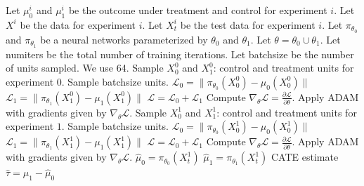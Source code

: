\begin{algorithm}[H]
	\caption{Warm Start T-learner}
	\label{alg:warm-t}
	\begin{algorithmic}[1]
		\State Let $\mu^{i}_0$ and $\mu^{i}_1$ be the outcome under treatment and control for experiment $i$. 
		\State Let $X^i$ be the data for experiment $i$. Let $X^i_t$ be the test data for experiment $i$. 
		\State Let $\pi_{\theta_0}$ and $\pi_{\theta_1}$ be a neural networks parameterized by $\theta_0$ and $\theta_1$. 
		\State Let $\theta = \theta_0 \cup \theta_1$. 
		\State Let numiters be the total number of training iterations.
		\State Let batchsize be the number of units sampled. We use 64. 
		\State Sample $X^0_0$ and $X^0_1$: control and treatment units for experiment $0$. Sample batchsize units.  
		\State $\mathcal{L}_0= \| \pi_{\theta_0} (X^0_0) - \mu_0(X^0_0) \| $
		\State $\mathcal{L}_1 = \| \pi_{\theta_1} (X^0_1) - \mu_1(X^0_1) \| $
		\State $\mathcal{L} = \mathcal{L}_0 + \mathcal{L}_1$
		\State Compute $\nabla_{\theta} \mathcal{L} = \frac{\partial \mathcal{L}}{\partial \theta}$.
		\State Apply ADAM with gradients given by $\nabla_{\theta} \mathcal{L}$. 
		\EndFor
		\State Sample $X^1_0$ and $X^1_1$: control and treatment units for experiment $1$. Sample batchsize units.  
		\State $\mathcal{L}_0= \| \pi_{\theta_0} (X^1_0) - \mu_0(X^1_0) \| $
		\State $\mathcal{L}_1 = \| \pi_{\theta_1} (X^1_1) - \mu_1(X^1_1) \| $
		\State $\mathcal{L} = \mathcal{L}_0 + \mathcal{L}_1$
		\State Compute $\nabla_{\theta} \mathcal{L} = \frac{\partial \mathcal{L}}{\partial \theta}$.
		\State Apply ADAM with gradients given by $\nabla_{\theta} \mathcal{L}$. 
		\EndFor
		\State $\hat{\mu}_0 = \pi_{\theta_0} (X^1_t)$
		\State $\hat{\mu}_1 = \pi_{\theta_1} (X^1_t)$
		 CATE estimate $\hat{\tau} = \hat{\mu}_1 - \hat{\mu}_0$
	\end{algorithmic}
\end{algorithm}

\newpage

